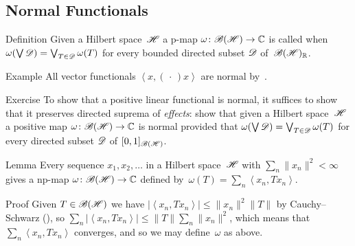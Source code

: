 \documentclass[a]{subfiles}
\begin{document}
\subsection{Normal Functionals}
\begin{parsec}%
\begin{point}{Definition}%
Given a Hilbert space~$\mathscr{H}$
a p-map $\omega\colon \mathscr{B}(\mathscr{H})\to\mathbb{C}$
is called %
when
$\omega(\bigvee \mathscr{D})=\bigvee_{T\in\mathscr{D}} \omega(T)$
for every bounded directed subset $\mathscr{D}$ of~$\mathscr{B}(\mathscr{H})_{\mathbb{R}}$.
\end{point}
\begin{point}{Example}%
All vector functionals%
$\left<x,(\,\cdot\,)x\right>$ are normal by~.
\end{point}
\begin{point}{Exercise}%
To show that a positive linear functional is normal, it suffices to show 
that it preserves directed suprema of \emph{effects}: 
show that given a Hilbert space~$\mathscr{H}$
a  positive map $\omega\colon \mathscr{B}(\mathscr{H})\to\mathbb{C}$
is normal 
provided that $\omega(\bigvee \mathscr{D}) = \bigvee_{T\in\mathscr{D}} \omega(T)$
for every directed subset $\mathscr{D}$ of $[0,1]_{\mathscr{B}(\mathscr{H})}$.
\end{point}
\begin{point}{Lemma}%
Every sequence $x_1,x_2,\dotsc $ in a Hilbert space~$\mathscr{H}$
with $\sum_n \|x_n\|^2 < \infty$
gives a np-map $\omega\colon\mathscr{B}(\mathscr{H})\to\mathbb{C}$
defined by~$\omega(T)=\sum_n \left<x_n,Tx_n\right>$.
\begin{point}{Proof}%
Given $T\in\mathscr{B}(\mathscr{H})$ 
we have $\left|\left<x_n,Tx_n\right>\right|\leq \|x_n\|^2\|T\|$ 
by Cauchy--Schwarz (),
so $\sum_n \left|\left<x_n,Tx_n\right>\right|
\leq \|T\| \sum_n \|x_n\|^2$,
which means that~$\sum_n \left<x_n,Tx_n\right>$
converges, 
and so we may define~$\omega$ as above.


\end{point}
\end{point}
\end{parsec}
\end{document}
